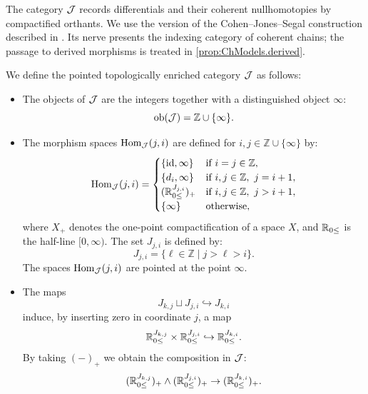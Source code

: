 The category $\mathcal{J}$ records differentials and their coherent nullhomotopies by compactified orthants. We use the version of the Cohen--Jones--Segal construction described in \cite{Cohen08,cote2023equivariant}. Its nerve presents the indexing category of coherent chains; the passage to derived morphisms is treated in \cref{prop:ChModels.derived}.

\begin{defn}
We define the pointed topologically enriched category $\mathcal{J}$ as follows:
\begin{itemize}
    \item The objects of $\mathcal{J}$ are the integers together with a distinguished object $\infty$:
    \begin{equation*}
        \operatorname{ob}(\mathcal{J}) = \mathbb{Z} \cup \{ \infty \}.
    \end{equation*}
    \item The morphism spaces $\operatorname{Hom}_{\mathcal{J}}(j, i)$ are defined for $i, j \in \mathbb{Z} \cup \{ \infty \}$ by:
    \begin{equation*}
        \operatorname{Hom}_{\mathcal{J}}(j, i) =
        \begin{cases}
            \{ \operatorname{id}, \infty \} & \text{if } i = j\in\mathbb{Z}, \\
            \{ d_i, \infty \} & \text{if } i,j\in\mathbb{Z},\ j = i + 1, \\
            (\mathbb{R}_{0 \leq}^{J_{j,i}})_+ & \text{if } i,j\in\mathbb{Z},\ j > i + 1, \\
            \{ \infty \} & \text{otherwise},
        \end{cases}
    \end{equation*}
    where $X_+$ denotes the one-point compactification of a space $X$, and $\mathbb{R}_{0 \leq}$ is the half-line $[0, \infty)$. The set $J_{j,i}$ is defined by:
    \begin{equation}\label{eq:J_indices}
        J_{j,i} = \{ \ell \in \mathbb{Z} \mid j > \ell > i \}.
    \end{equation}
    The spaces $\operatorname{Hom}_{\mathcal{J}}(j, i)$ are pointed at the point $\infty$.
    \item The maps
    \begin{equation*}
        J_{k,j}\sqcup J_{j,i} \hookrightarrow J_{k,i}
    \end{equation*}
    induce, by inserting zero in coordinate $j$, a map
    \begin{equation*}
        \mathbb{R}_{0 \leq}^{J_{k,j}}\times \mathbb{R}_{0 \leq}^{J_{j,i}} \hookrightarrow \mathbb{R}_{0 \leq}^{J_{k,i}}.
    \end{equation*}
    By taking $(-)_+$ we obtain the composition in $\mathcal{J}$:
    \begin{equation*}
        (\mathbb{R}_{0 \leq}^{J_{k,j}})_+\wedge (\mathbb{R}_{0 \leq}^{J_{j,i}})_+ \to (\mathbb{R}_{0 \leq}^{J_{k,i}})_+.
    \end{equation*}
\end{itemize}
\end{defn}

